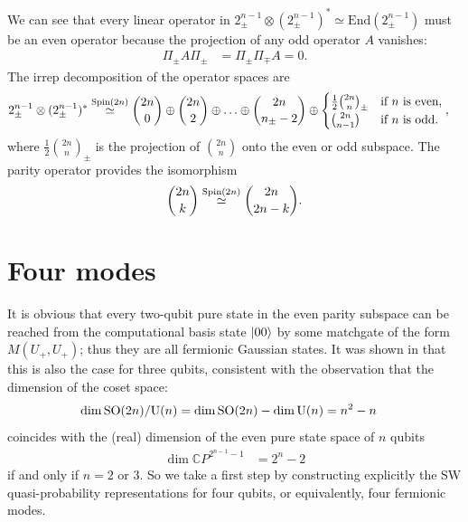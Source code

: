 
We can see that every linear operator in $ 2^{n-1}_{\pm} \otimes (2^{n-1}_{\pm})^* \simeq \text{End}(2^{n-1}_{\pm})$ must be an even operator because the projection of any odd operator $A$ vanishes:
\begin{align}
	\Pi_{\pm} A \Pi_{\pm} &= \Pi_{\pm}\Pi_{\mp} A = 0.
\end{align}
The irrep decomposition of the operator spaces are
\begin{align}
	2^{n-1}_{\pm}\otimes(2^{n-1}_{\pm})^* &\stackrel{\text{Spin}(2n)}{\simeq}
	\binom{2n}{0}\oplus\binom{2n}{2}\oplus\ldots
	\oplus\binom{2n}{n_{\pm}-2}\oplus
	\begin{cases}
		\frac{1}{2}\binom{2n}{n}_{\pm} & \text{if $n$ is even,} \\
		\binom{2n}{n-1} & \text{if $n$ is odd.}
	\end{cases},
\end{align}
where $\frac{1}{2}\binom{2n}{n}_{\pm}$ is the projection of $\binom{2n}{n}$ onto the even or odd subspace. The parity operator provides the isomorphism
\begin{align}
	{2n \choose k} \stackrel{\text{Spin}(2n)}{\simeq} {2n \choose 2n-k}.
\end{align}

\section{Four modes}\label{ch5:four-modes}

It is obvious that every two-qubit pure state in the even parity subspace can be reached from the computational basis state ${\left\vert{00}\right\rangle}$ by some matchgate of the form $M(U_+,U_+)$; thus they are all fermionic Gaussian states. It was shown in \cite{bravyi_classical_2005,melo_power_2013} that this is also the case for three qubits, consistent with the observation that the dimension of the coset space:
\begin{align}
	\dim \text{SO}(2n)/\text{U}(n) &= \dim \text{SO}(2n) - \dim \text{U}(n) = n^2 - n
\end{align}
coincides with the (real) dimension of the even pure state space of $n$ qubits
\begin{align}
	\dim \mathbb{C}P^{2^{n-1}-1} &= 2^n - 2
\end{align}
if and only if $n=2$ or 3. So we take a first step by constructing explicitly the SW quasi-probability representations for four qubits, or equivalently, four fermionic modes.


